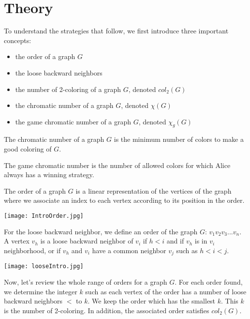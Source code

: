 \chapter{Theory}

To understand the strategies that follow, we first introduce three important concepts:
\begin{itemize}
\item the order of a graph $G$
\item the loose backward neighbors
\item the number of 2-coloring of a graph $G$, denoted $col_{2}(G)$
\item the chromatic number of a graph $G$, denoted $\chi(G)$
\item the game chromatic number of a graph $G$, denoted $\chi_{g}(G)$
\end{itemize}


The chromatic number of a graph $G$ is the minimum number of colors to make a good coloring of $G$.

The game chromatic number is the number of allowed colors for which Alice always has a winning strategy.

The order of a graph $G$ is a linear representation of the vertices of the graph where we associate an index to each vertex according to its position in the order.

\texttt{[image: IntroOrder.jpg]}

For the loose backward neighbor, we define an order of the graph $G$: $v_{1} v_{2} v_{3}... v_{n}$. A vertex $v_{h}$ is a loose backward neighbor of $v_{i}$ if $h < i$ and if $v_{h}$ is in $v_{i}$ neighborhood, or if $v_{h}$ and $v_{i}$ have a common neighbor $v_{j}$ such as $ h < i < j$.

\texttt{[image: looseIntro.jpg]}

Now, let's review the whole range of orders for a graph $G$. For each order found, we determine the integer $k$ such as each vertex of the order has a number of loose backward neighbors $<$ to $k$. We keep the order which has the smallest $k$. This $k$ is the number of 2-coloring. In addition, the associated order satisfies $col_{2}(G)$.





